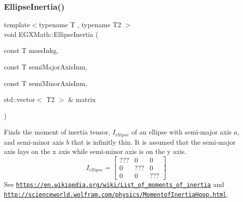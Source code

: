 \subsubsection{\texorpdfstring{Ellipse\+Inertia()}{EllipseInertia()}\hspace{0.1cm}{\footnotesize\ttfamily [2/3]}}
{\footnotesize\ttfamily template$<$typename T , typename T2 $>$ \\
void E\+G\+X\+Math\+::\+Ellipse\+Inertia (\begin{DoxyParamCaption}\item[{const T}]{mass\+Inkg,  }\item[{const T}]{semi\+Major\+Axis\+Inm,  }\item[{const T}]{semi\+Minor\+Axis\+Inm,  }\item[{std\+::vector$<$ T2 $>$ \&}]{matrix }\end{DoxyParamCaption})}



Finds the moment of inertia tensor, $I_{ellipse}$ of an ellipse with semi-\/major axis $a$, and semi-\/minor axis $b$ that is infinitly thin. It is assumed that the semi-\/major axis lays on the x axis while semi-\/minor axis is on the y axis. \[ I_{ellipse}=\begin{bmatrix} ??? & 0 & 0\\ 0 & ??? & 0\\ 0 & 0 & ??? \end{bmatrix} \] See \href{https://en.wikipedia.org/wiki/List_of_moments_of_inertia}{\tt https\+://en.\+wikipedia.\+org/wiki/\+List\+\_\+of\+\_\+moments\+\_\+of\+\_\+inertia} and \href{http://scienceworld.wolfram.com/physics/MomentofInertiaHoop.html}{\tt http\+://scienceworld.\+wolfram.\+com/physics/\+Momentof\+Inertia\+Hoop.\+html}. 


